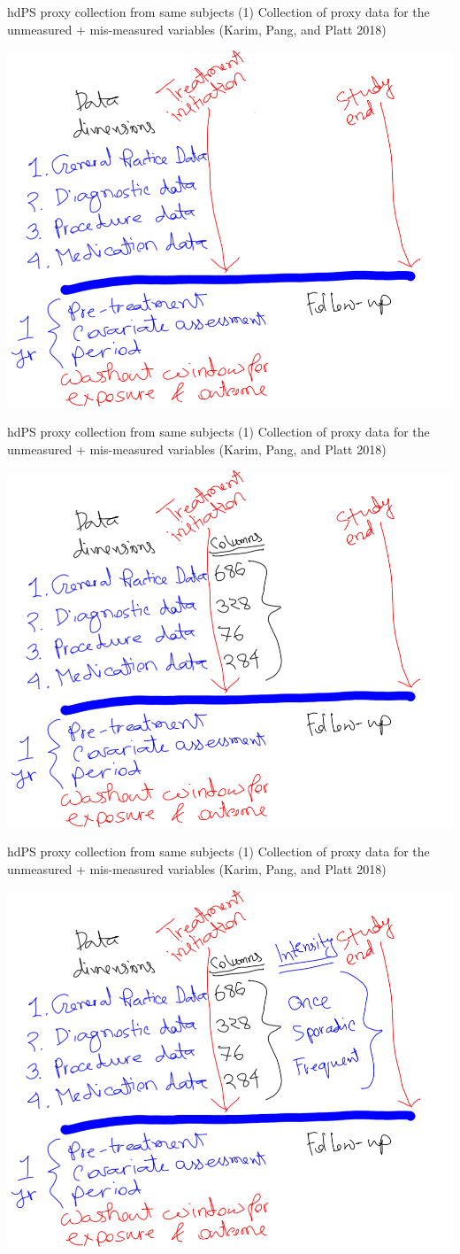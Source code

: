 \documentclass[
  ignorenonframetext,
  aspectratio=169]{beamer}
\begin{document}
\begin{frame}{hdPS proxy collection from same subjects (1)}
\protect\hypertarget{hdps-proxy-collection-from-same-subjects-1}{}
Collection of proxy data for the unmeasured + mis-measured variables
(Karim, Pang, and Platt 2018)

\begin{center}
\includegraphics[width=0.45\linewidth]{proxy1.png}
\end{center}
\end{frame}

\begin{frame}{hdPS proxy collection from same subjects (1)}
\protect\hypertarget{hdps-proxy-collection-from-same-subjects-1-1}{}
Collection of proxy data for the unmeasured + mis-measured variables
(Karim, Pang, and Platt 2018)

\begin{center}
\includegraphics[width=0.45\linewidth]{proxy2.png}
\end{center}
\end{frame}

\begin{frame}{hdPS proxy collection from same subjects (1)}
\protect\hypertarget{hdps-proxy-collection-from-same-subjects-1-2}{}
Collection of proxy data for the unmeasured + mis-measured variables
(Karim, Pang, and Platt 2018)

\begin{center}
\includegraphics[width=0.45\linewidth]{proxy3.png}
\end{center}
\end{frame}
\end{document}
